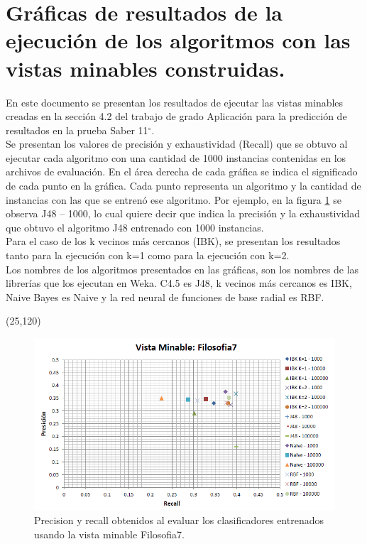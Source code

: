 \documentclass{article}
\newcommand{\degree}{\ensuremath{^\circ}}
\begin{document}
\section*{Gráficas de resultados de la ejecución de los algoritmos con las vistas minables construidas.}
En este documento se presentan los resultados de ejecutar las vistas minables creadas en la sección 4.2 del trabajo de grado Aplicación para la predicción de resultados en la prueba Saber 11\degree.\\

Se presentan los valores de precisión y exhaustividad (Recall) que se obtuvo al ejecutar cada algoritmo con una cantidad de 1000  instancias contenidas en los archivos de evaluación. En el área derecha de cada gráfica se indica el significado de cada punto en la gráfica. Cada punto representa un algoritmo y la cantidad de instancias con las que se entrenó ese algoritmo. Por ejemplo, en la figura \ref{fig:figura1} se observa J48 – 1000, lo cual quiere decir que indica la precisión y la exhaustividad que obtuvo el algoritmo J48 entrenado con 1000 instancias.\\

Para el caso de los k vecinos más cercanos (IBK), se presentan los resultados tanto para la ejecución con k=1 como para la ejecución con k=2.\\

Los nombres de los algoritmos presentados en las gráficas, son los nombres de las librerías que los ejecutan en Weka. C4.5 es J48, k vecinos más cercanos es IBK, Naive Bayes es Naive y la red neural de funciones de base radial es RBF.\\
\begin{textblock}{80}(25,120)
\begin{figure}[!htb]
\begin{centering}
\includegraphics[scale=0.4]{filosofia7}
\par\end{centering}
\caption{Precision y recall obtenidos al evaluar los clasificadores entrenados usando la vista minable Filosofia7.}
\label{fig:figura1}
\end{figure}
\end{textblock}
\end{document}
